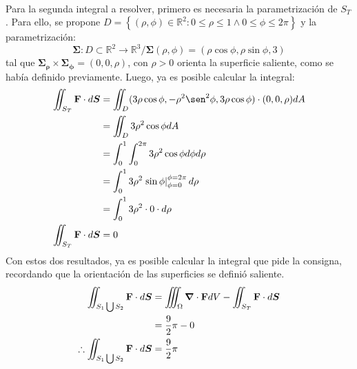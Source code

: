 \begin{solution}
\begin{align*}
    \end{align*}
    Para la segunda integral a resolver, primero es necesaria la parametrización de $S_T$. Para ello, se propone 
    $D=\left\{(\rho,\phi) \in \mathbb{R}^2 : 0\leq\rho\leq1 \land 0\leq\phi\leq2\pi\right\}$ y la parametrización:
    \begin{equation*}
        \boldsymbol{\Sigma} : D \subset \mathbb{R}^2 \longrightarrow \mathbb{R}^3 / \boldsymbol{\Sigma}(\rho,\phi) = \left(\rho\cos{\phi},\rho\sin{\phi},3\right)
    \end{equation*}
    tal que $\boldsymbol{\Sigma_{\rho}}\times\boldsymbol{\Sigma_{\phi}} = \left(0,0,\rho\right)$, con $\rho>0$ orienta la superficie saliente, como se había definido previamente.
    Luego, ya es posible calcular la integral:
    \begin{align*}
        \iint_{S_T} \mathbf{F} \cdot d\boldsymbol{S} &= \iint_{D} (3\rho\cos{\phi},-\rho^2\sen^2{\phi},3\rho\cos{\phi}) \cdot (0,0,\rho)dA\\
        &= \iint_{D} 3\rho^2\cos{\phi}dA\\
        &= \int_{0}^{1} \int_{0}^{2\pi} 3\rho^2\cos{\phi} d\phi d\rho\\
        &= \int_{0}^{1} 3\rho^2\left.\sin{\phi}\right|_{\phi=0}^{\phi=2\pi} d\rho \\
        &= \int_{0}^{1} 3\rho^2\cdot 0 \cdot d\rho\\
        \iint_{S_T} \mathbf{F} \cdot d\boldsymbol{S} &= 0 \\
    \end{align*}
    Con estos dos resultados, ya es posible calcular la integral que pide la consigna, recordando que la orientación de las superficies se definió saliente.
    \begin{align*}
        \iint_{S_1 \bigcup S_2} \mathbf{F} \cdot d\boldsymbol{S} &= \iiint_{\Omega} \grad \cdot \mathbf{F} dV - \iint_{S_T} \mathbf{F} \cdot d\boldsymbol{S}\\
        &= \frac{9}{2}\pi - 0\\
        \therefore \iint_{S_1 \bigcup S_2} \mathbf{F} \cdot d\boldsymbol{S} &= \frac{9}{2}\pi
    \end{align*}
\end{solution}


